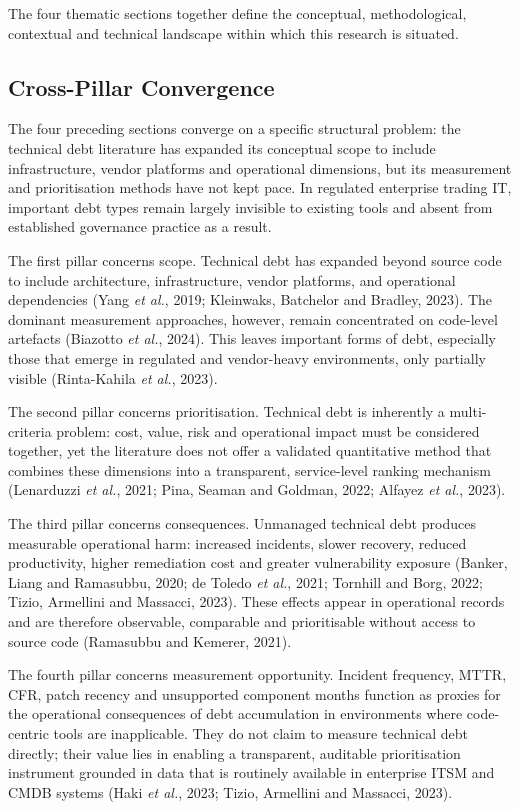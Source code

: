 \documentclass[
  12pt,
  letterpaper,
  12pt,
  oneside,
  english,
  onehalfspacing,
  headsepline]{MastersDoctoralThesis}
\begin{document}
The four thematic sections together define the conceptual,
methodological, contextual and technical landscape within which this
research is situated.

\subsection{Cross-Pillar Convergence}\label{cross-pillar-convergence}

The four preceding sections converge on a specific structural problem:
the technical debt literature has expanded its conceptual scope to
include infrastructure, vendor platforms and operational dimensions, but
its measurement and prioritisation methods have not kept pace. In
regulated enterprise trading IT, important debt types remain largely
invisible to existing tools and absent from established governance
practice as a result.

The first pillar concerns scope. Technical debt has expanded beyond
source code to include architecture, infrastructure, vendor platforms,
and operational dependencies (Yang \emph{et al.}, 2019; Kleinwaks,
Batchelor and Bradley, 2023). The dominant measurement approaches,
however, remain concentrated on code-level artefacts (Biazotto \emph{et
al.}, 2024). This leaves important forms of debt, especially those that
emerge in regulated and vendor-heavy environments, only partially
visible (Rinta-Kahila \emph{et al.}, 2023).

The second pillar concerns prioritisation. Technical debt is inherently
a multi-criteria problem: cost, value, risk and operational impact must
be considered together, yet the literature does not offer a validated
quantitative method that combines these dimensions into a transparent,
service-level ranking mechanism (Lenarduzzi \emph{et al.}, 2021; Pina,
Seaman and Goldman, 2022; Alfayez \emph{et al.}, 2023).

The third pillar concerns consequences. Unmanaged technical debt
produces measurable operational harm: increased incidents, slower
recovery, reduced productivity, higher remediation cost and greater
vulnerability exposure (Banker, Liang and Ramasubbu, 2020; de Toledo
\emph{et al.}, 2021; Tornhill and Borg, 2022; Tizio, Armellini and
Massacci, 2023). These effects appear in operational records and are
therefore observable, comparable and prioritisable without access to
source code (Ramasubbu and Kemerer, 2021).

The fourth pillar concerns measurement opportunity. Incident frequency,
MTTR, CFR, patch recency and unsupported component months function as
proxies for the operational consequences of debt accumulation in
environments where code-centric tools are inapplicable. They do not
claim to measure technical debt directly; their value lies in enabling a
transparent, auditable prioritisation instrument grounded in data that
is routinely available in enterprise ITSM and CMDB systems (Haki
\emph{et al.}, 2023; Tizio, Armellini and Massacci, 2023).
\end{document}
